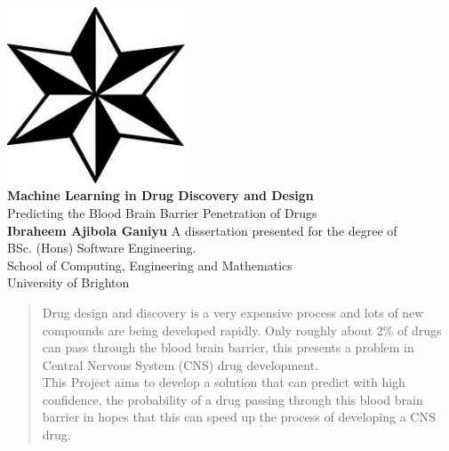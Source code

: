\documentclass[a4paper,12pt]{report}
\begin{document}
\begin{titlepage}
	\begin{center}
		\includegraphics[scale=1,width=0.4\textwidth]{images/uob_logo} \\
		\huge
		\textbf{Machine Learning in Drug Discovery and Design\\}
		\vspace{0.5cm}
		\Large
		Predicting the Blood Brain Barrier Penetration of Drugs \\
		\vspace{1.5cm}
		\textbf{Ibraheem Ajibola Ganiyu}
		\vfill
		A dissertation presented for the degree of \\
		BSc. (Hons) Software Engineering. \\
		\vspace{0.8cm}
		\large
		School of Computing, Engineering and Mathematics \\
		University of Brighton \\
		\date{\today}
	\end{center}
\end{titlepage}

\tableofcontents
\newpage
\listoffigures
\listoftables
\newpage
{}


\begin{abstract}
	Drug design and discovery is a very expensive process and lots of new compounds are being developed rapidly. Only roughly about 2\% of drugs can pass through the blood brain barrier, this presents a problem in Central Nervous System (CNS) drug development. \\
	This Project aims to develop a solution that can predict with high confidence, the probability of a drug passing through this blood brain barrier in hopes that this can speed up the process of developing a CNS drug.
\end{abstract}
\end{document}
